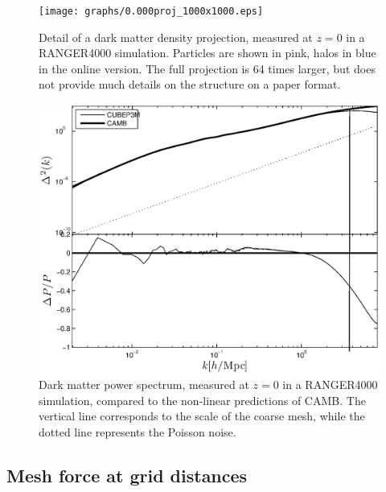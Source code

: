 \begin{figure}%
  \begin{center}
\texttt{[image: graphs/0.000proj\_1000x1000.eps]}
  \caption{Detail of a dark matter density projection, measured at $z=0$ in a RANGER4000 simulation.
  Particles are shown in pink, halos in blue in the online version. The full projection is 64 times larger,
  but does not provide much details on the structure on a paper format.
    \label{fig:density}}
\end{center}
\end{figure}


\begin{figure}%
  \begin{center}
    \includegraphics[width=5.2in]{graphs/power_highres.eps}
  \caption{Dark matter power spectrum, measured at $z=0$ in a RANGER4000 simulation,
  compared to the non-linear predictions of {\small CAMB}. 
  The vertical line corresponds to the scale of the coarse mesh, while the dotted line represents the Poisson noise.
    \label{fig:power_highres}}
\end{center}
\end{figure}

\subsection{Mesh force at grid distances}
\label{subsec:force}

